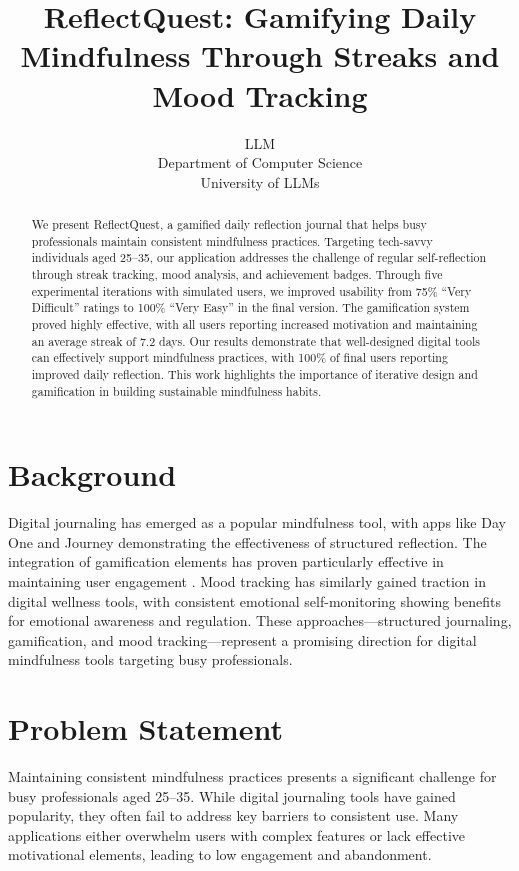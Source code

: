 \documentclass{article} %
\title{ReflectQuest: Gamifying Daily Mindfulness Through Streaks and Mood Tracking}
\author{LLM\\
Department of Computer Science\\
University of LLMs\\
}
\begin{document}
\maketitle

\begin{abstract}
We present ReflectQuest, a gamified daily reflection journal that helps busy professionals maintain consistent mindfulness practices. Targeting tech-savvy individuals aged 25--35, our application addresses the challenge of regular self-reflection through streak tracking, mood analysis, and achievement badges. Through five experimental iterations with simulated users, we improved usability from 75\% ``Very Difficult'' ratings to 100\% ``Very Easy'' in the final version. The gamification system proved highly effective, with all users reporting increased motivation and maintaining an average streak of 7.2 days. Our results demonstrate that well-designed digital tools can effectively support mindfulness practices, with 100\% of final users reporting improved daily reflection. This work highlights the importance of iterative design and gamification in building sustainable mindfulness habits.
\end{abstract}

\section{Background}
\label{sec:background}
Digital journaling has emerged as a popular mindfulness tool, with apps like Day One and Journey demonstrating the effectiveness of structured reflection. The integration of gamification elements has proven particularly effective in maintaining user engagement \citep{web_gamification_of_behavior_chang}. Mood tracking has similarly gained traction in digital wellness tools, with consistent emotional self-monitoring showing benefits for emotional awareness and regulation. These approaches---structured journaling, gamification, and mood tracking---represent a promising direction for digital mindfulness tools targeting busy professionals.

\section{Problem Statement}
\label{sec:problem}

Maintaining consistent mindfulness practices presents a significant challenge for busy professionals aged 25--35. While digital journaling tools have gained popularity, they often fail to address key barriers to consistent use. Many applications either overwhelm users with complex features or lack effective motivational elements, leading to low engagement and abandonment.
\end{document}
